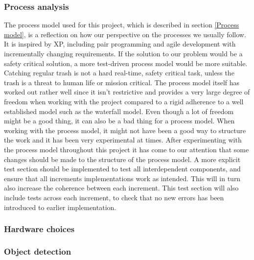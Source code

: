 \subsubsection{Process analysis}
The process model used for this project, which is described in section \ref{Process model}, is a reflection on how our perspective on the processes we usually follow. It is inspired by XP, including pair programming and agile development with incrementally changing requirements. If the solution to our problem would be a safety critical solution, a more test-driven process model would be more suitable. Catching regular trash is not a hard real-time, safety critical task, unless the trash is a threat to human life or mission critical.\newline
The process model itself has worked out rather well since it isn’t restrictive and provides a very large degree of freedom when working with the project compared to a rigid adherence to a well established model such as the waterfall model. \newline
Even though a lot of freedom might be a good thing, it can also be a bad thing for a process model. When working with the process model, it might not have been a good way to structure the work and it has been very experimental at times. \newline
After experimenting with the process model throughout this project it has come to our attention that some changes should be made to the structure of the process model. A more explicit test section should be implemented to test all interdependent components, and ensure that all increments implementations work as intended. This will in turn also increase the coherence between each increment. This test section will also include tests across each increment, to check that no new errors has been introduced to earlier implementation.


\subsubsection{Hardware choices}




\subsubsection{Object detection}


